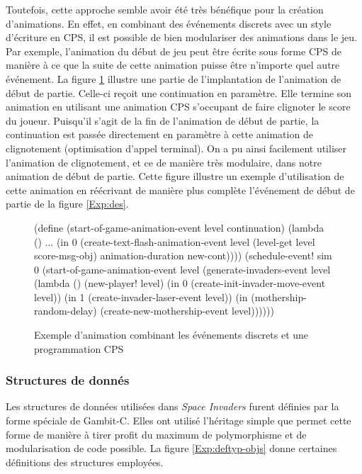 \documentclass[12pt,oneside,letterpaper,francais]{book}
\newcommand{\si}{{\textit{Space Invaders }}}
\newcommand{\scheme}[1]{\selectlanguage{english}{\tt #1}\selectlanguage{french}}
\begin{document}
Toutefois, cette approche semble avoir été très bénéfique pour la
création d'animations. En effet, en combinant des événements discrets
avec un style d'écriture en CPS, il est possible de bien modulariser
des animations dans le jeu. Par exemple, l'animation du début de jeu
peut être écrite sous forme CPS de manière à ce que la suite de cette
animation puisse être n'importe quel autre événement. La figure
\ref{Exp:anim} illustre une partie de l'implantation de l'animation de
début de partie. Celle-ci reçoit une continuation en paramètre. Elle
termine son animation en utilisant une animation CPS s'occupant de
faire clignoter le score du joueur. Puisqu'il s'agit de la fin de
l'animation de début de partie, la continuation est passée directement
en paramètre à cette animation de clignotement (optimisation d'appel
terminal). On a pu ainsi facilement utiliser l'animation de
clignotement, et ce de manière très modulaire, dans notre animation de
début de partie. Cette figure illustre un exemple d'utilisation de
cette animation en réécrivant de manière plus complète l'événement de
début de partie de la figure \ref{Exp:des}.

\begin{figure}[htb!]
  \begin{schemecode}
(define (start-of-game-animation-event level continuation)
  (lambda ()
    ...
    (in 0 (create-text-flash-animation-event level
            (level-get level score-msg-obj)
            animation-duration new-cont))))
(schedule-event! sim 0
  (start-of-game-animation-event level
    (generate-invaders-event level
      (lambda ()
        (new-player! level)
        (in 0 (create-init-invader-move-event level))
        (in 1 (create-invader-laser-event level))
        (in (mothership-random-delay)
            (create-new-mothership-event level))))))
  \end{schemecode}
  \caption{Exemple d'animation combinant les événements discrets et
    une programmation CPS}
  \label{Exp:anim}
\end{figure}

\subsubsection{Structures de donnés}

Les structures de données utilisées dans \si furent définies par la
forme spéciale \scheme{define-type} de Gambit-C. Elles ont utilisé
l'héritage simple que permet cette forme de manière à tirer profit du
maximum de polymorphisme et de modularisation de code possible. La
figure \ref{Exp:deftyp-objs} donne certaines définitions des
structures employées.
\end{document}

